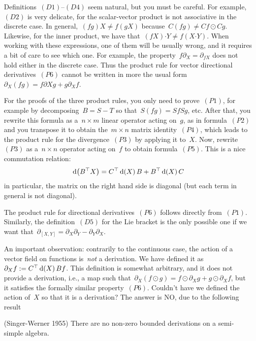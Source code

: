 \restoregeometry
\clearpage

Definitions~$(D1)$--$(D4)$ seem natural, but you must be careful.
For example,~$(D2)$ is very delicate, for the scalar-vector product is not
associative in the discrete case.  In general,~$(fg)X\neq f(gX)$
because~$C(fg)\neq Cf\odot Cg$.
Likewise, for the inner product, we have
that~$\left(fX\right)\boldsymbol{\cdot}Y\neq f\left(X\boldsymbol{\cdot}
Y\right)$.  When working with these expressions, one of them will be usually
wrong, and it requires a bit of care to see which one.
For example, the
property~$f\partial_X=\partial_{fX}$ does not hold either in
the discrete case.  Thus the product rule for vector directional derivatives~$(P6)$ cannot be
written in more the usual form~$\partial_X(fg)=f\partial Xg+g\partial_Xf$.

For the proofs of the three
product rules, you only need to prove~$(P1)$, for
example by decomposing~$B=S-T$ so that~$S(fg)=SfSg$, etc.
After that, you rewrite this formula as
a~$n\times m$ linear operator acting on~$g$, as in formula~$(P2)$ and you
transpose it to obtain the~$m\times n$ matrix identity~$(P4)$, which leads to
the product rule for the divergence~$(P3)$ by applying it to~$X$.  Now,
rewrite~$(P3)$ as a~$n\times n$ operator acting on~$f$ to obtain
formula~$(P5)$.   This is a nice commutation relation:
\[
	\,\mathrm{d}\!\left(B^\top X\right)=C^\top\,\mathrm{d}\!\left(X\right)B+B^\top\,\mathrm{d}\!\left(X\right)C
\]
in particular, the matrix on the right hand side is diagonal (but each term
in general is not diagonal).

The product rule for directional derivatives~$(P6)$ follows directly
from~$(P1)$.  Similarly, the definition~$(D5)$ for the Lie bracket is the
only possible one if we want
that~$\partial_{[X,Y]}=\partial_X\partial_Y-\partial_Y\partial_X$.

An important observation: contrarily to the continuous case, the action of
a vector field on functions is~\emph{not} a derivation.  We have defined it
as~$\partial_Xf:=C^\top \,\mathrm{d}\!\left(X\right)Bf$.  This definition is somewhat arbitrary,
and it does not provide a derivation, i.e., a map such
that~$\partial_X\left(f\odot g\right)=f\odot\partial_Xg+g\odot\partial_Xf$,
but it satisfies the formally similar property~$(P6)$.  Couldn't have we
defined the action of~$X$ so that it is a derivation?  The answer is NO, due
to the following result

\begin{theorem}(Singer-Werner 1955)
	There are no non-zero bounded derivations on a semi-simple algebra.
\end{theorem}

